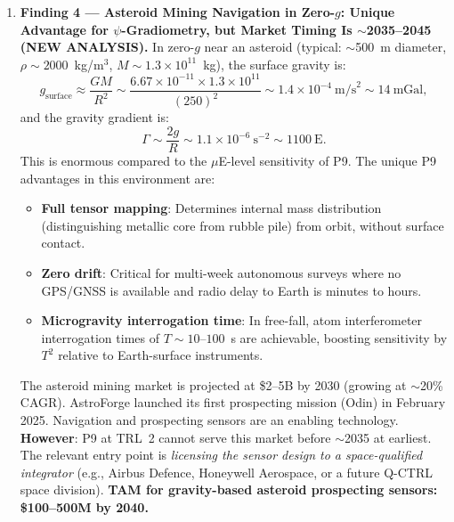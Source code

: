 \documentclass[11pt]{article}
\theoremstyle{definition}
\theoremstyle{remark}
\newcommand{\ee}[1]{\times10^{#1}}
\begin{document}
\begin{enumerate}
\item \textbf{Finding 4 --- Asteroid Mining Navigation in Zero-$g$:
  Unique Advantage for $\psi$-Gradiometry, but Market Timing Is
  $\sim$2035--2045 (NEW ANALYSIS).} In zero-$g$ near an asteroid
  (typical: $\sim$500~m diameter, $\rho \sim 2000$~kg/m$^3$,
  $M \sim 1.3\ee{11}$~kg), the surface gravity is:
  \begin{equation}
    g_{\text{surface}} \approx \frac{GM}{R^2}
    \sim \frac{6.67\ee{-11} \times 1.3\ee{11}}{(250)^2}
    \sim 1.4\ee{-4}~\text{m/s}^2 \sim 14~\text{mGal},
  \end{equation}
  and the gravity gradient is:
  \begin{equation}
    \Gamma \sim \frac{2g}{R} \sim 1.1\ee{-6}~\text{s}^{-2}
    \sim 1100~\text{E}.
  \end{equation}
  This is enormous compared to the $\mu$E-level sensitivity of P9.
  The unique P9 advantages in this environment are:
  \begin{itemize}
    \item \textbf{Full tensor mapping}: Determines internal mass
      distribution (distinguishing metallic core from rubble pile)
      from orbit, without surface contact.
    \item \textbf{Zero drift}: Critical for multi-week autonomous
      surveys where no GPS/GNSS is available and radio delay to
      Earth is minutes to hours.
    \item \textbf{Microgravity interrogation time}: In free-fall,
      atom interferometer interrogation times of $T \sim 10$--$100$~s
      are achievable, boosting sensitivity by $T^2$ relative to
      Earth-surface instruments.
  \end{itemize}
  The asteroid mining market is projected at \$2--5B by 2030
  (growing at $\sim$20\% CAGR). AstroForge launched its first
  prospecting mission (Odin) in February 2025. Navigation and
  prospecting sensors are an enabling technology.
  \textbf{However}: P9 at TRL~2 cannot serve this market before
  $\sim$2035 at earliest. The relevant entry point is \emph{licensing
  the sensor design to a space-qualified integrator} (e.g., Airbus
  Defence, Honeywell Aerospace, or a future Q-CTRL space division).
  \textbf{TAM for gravity-based asteroid prospecting sensors:
  \$100--500M by 2040.}


\end{enumerate}
\end{document}
